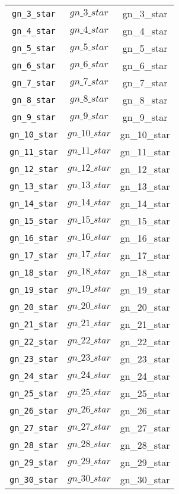 \begin{center}
\begin{longtable}{ccc}
\texttt{gn\_3\_star} & $gn\_3\_star$ & gn\_3\_star\\
\texttt{gn\_4\_star} & $gn\_4\_star$ & gn\_4\_star\\
\texttt{gn\_5\_star} & $gn\_5\_star$ & gn\_5\_star\\
\texttt{gn\_6\_star} & $gn\_6\_star$ & gn\_6\_star\\
\texttt{gn\_7\_star} & $gn\_7\_star$ & gn\_7\_star\\
\texttt{gn\_8\_star} & $gn\_8\_star$ & gn\_8\_star\\
\texttt{gn\_9\_star} & $gn\_9\_star$ & gn\_9\_star\\
\texttt{gn\_10\_star} & $gn\_10\_star$ & gn\_10\_star\\
\texttt{gn\_11\_star} & $gn\_11\_star$ & gn\_11\_star\\
\texttt{gn\_12\_star} & $gn\_12\_star$ & gn\_12\_star\\
\texttt{gn\_13\_star} & $gn\_13\_star$ & gn\_13\_star\\
\texttt{gn\_14\_star} & $gn\_14\_star$ & gn\_14\_star\\
\texttt{gn\_15\_star} & $gn\_15\_star$ & gn\_15\_star\\
\texttt{gn\_16\_star} & $gn\_16\_star$ & gn\_16\_star\\
\texttt{gn\_17\_star} & $gn\_17\_star$ & gn\_17\_star\\
\texttt{gn\_18\_star} & $gn\_18\_star$ & gn\_18\_star\\
\texttt{gn\_19\_star} & $gn\_19\_star$ & gn\_19\_star\\
\texttt{gn\_20\_star} & $gn\_20\_star$ & gn\_20\_star\\
\texttt{gn\_21\_star} & $gn\_21\_star$ & gn\_21\_star\\
\texttt{gn\_22\_star} & $gn\_22\_star$ & gn\_22\_star\\
\texttt{gn\_23\_star} & $gn\_23\_star$ & gn\_23\_star\\
\texttt{gn\_24\_star} & $gn\_24\_star$ & gn\_24\_star\\
\texttt{gn\_25\_star} & $gn\_25\_star$ & gn\_25\_star\\
\texttt{gn\_26\_star} & $gn\_26\_star$ & gn\_26\_star\\
\texttt{gn\_27\_star} & $gn\_27\_star$ & gn\_27\_star\\
\texttt{gn\_28\_star} & $gn\_28\_star$ & gn\_28\_star\\
\texttt{gn\_29\_star} & $gn\_29\_star$ & gn\_29\_star\\
\texttt{gn\_30\_star} & $gn\_30\_star$ & gn\_30\_star\\

\end{longtable}
\end{center}
